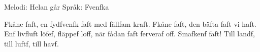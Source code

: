 \begin{song}

\begin{songmeta}
Melodi: Helan går
Språk: Fvenfka
\end{songmeta}

\begin{songtext}
Fkåne faft,
en fydfvenfk faft med fällfam kraft.
Fkåne faft,
den bäfta faft vi haft.
Enf livfluft löfef, fläppef loff,
när fådan faft ferveraf off.
Smafkenf faft!
Till landf, till luftf, till havf.
\end{songtext}
\end{song}
